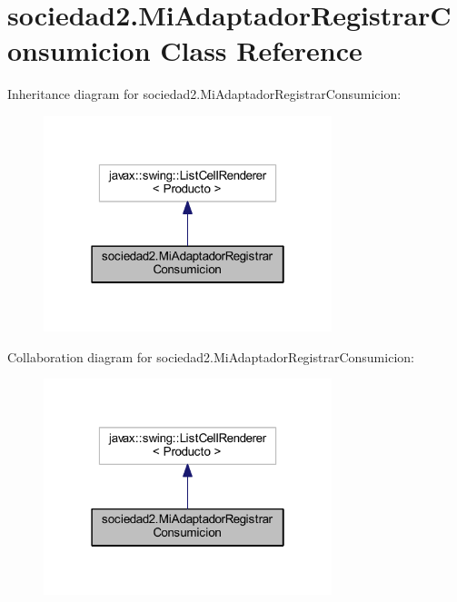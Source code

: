 \hypertarget{classsociedad2_1_1_mi_adaptador_registrar_consumicion}{}\section{sociedad2.\+Mi\+Adaptador\+Registrar\+Consumicion Class Reference}
\label{classsociedad2_1_1_mi_adaptador_registrar_consumicion}


Inheritance diagram for sociedad2.\+Mi\+Adaptador\+Registrar\+Consumicion\+:
\nopagebreak
\begin{figure}[H]
\begin{center}
\leavevmode
\includegraphics[width=238pt]{classsociedad2_1_1_mi_adaptador_registrar_consumicion__inherit__graph}
\end{center}
\end{figure}


Collaboration diagram for sociedad2.\+Mi\+Adaptador\+Registrar\+Consumicion\+:
\nopagebreak
\begin{figure}[H]
\begin{center}
\leavevmode
\includegraphics[width=238pt]{classsociedad2_1_1_mi_adaptador_registrar_consumicion__coll__graph}
\end{center}
\end{figure}
